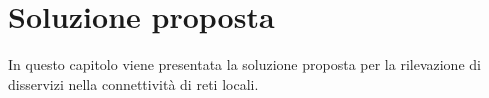 \chapter{Soluzione proposta}
In questo capitolo viene presentata la soluzione proposta per la rilevazione di disservizi nella connettivit\`a di reti locali.